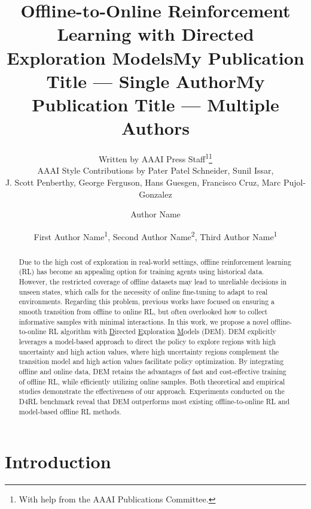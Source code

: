 \documentclass[letterpaper]{article} %
\title{Offline-to-Online Reinforcement Learning with Directed Exploration Models}
\author{
    Written by AAAI Press Staff\textsuperscript{\rm 1}\thanks{With help from the AAAI Publications Committee.}\\
    AAAI Style Contributions by Pater Patel Schneider,
    Sunil Issar,\\
    J. Scott Penberthy,
    George Ferguson,
    Hans Guesgen,
    Francisco Cruz\equalcontrib,
    Marc Pujol-Gonzalez\equalcontrib
}
\title{My Publication Title --- Single Author}
\author {
    Author Name
}
\title{My Publication Title --- Multiple Authors}
\author {
    First Author Name\textsuperscript{\rm 1},
    Second Author Name\textsuperscript{\rm 2},
    Third Author Name\textsuperscript{\rm 1}
}
\begin{document}
\maketitle

\begin{abstract}
Due to the high cost of exploration in real-world settings, offline reinforcement learning (RL) has become an appealing option for training agents using historical data. However, the restricted coverage of offline datasets may lead to unreliable decisions in unseen states, which calls for the necessity of online fine-tuning to adapt to real environments. Regarding this problem, previous works have focused on ensuring a smooth transition from offline to online RL, but often overlooked how to collect informative samples with minimal interactions. In this work, we propose a novel offline-to-online RL algorithm with \underline{D}irected \underline{E}xploration \underline{M}odels (DEM). DEM explicitly leverages a model-based approach to direct the policy to explore regions with high uncertainty and high action values, where high uncertainty regions complement the transition model and high action values facilitate policy optimization. By integrating offline and online data, DEM retains the advantages of fast and cost-effective training of offline RL, while efficiently utilizing online samples. Both theoretical and empirical studies demonstrate the effectiveness of our approach. Experiments conducted on the D4RL benchmark reveal that DEM outperforms most existing offline-to-online RL and model-based offline RL methods.
\end{abstract}


\section{Introduction}
\end{document}
